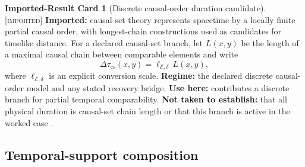 \documentclass[11pt]{article}
\newcommand{\Imp}{\textsc{[imported]}}
\theoremstyle{definition}
\newtheorem{scard}{Imported-Result Card}
\begin{document}
\begin{scard}[Discrete causal-order duration candidate]
\label{card:tspace-causal-set}
\Imp{} \textbf{Imported:} causal-set theory represents spacetime by a locally
finite partial causal order, with longest-chain constructions used as candidates
for timelike distance. For a declared causal-set branch, let $L(x,y)$ be the
length of a maximal causal chain between comparable elements and write
\begin{equation}
\Delta\tau_{\mathrm{cs}}(x,y)=\ell_{\mathcal E,\delta}\,L(x,y),
\label{eq:tspace-causal-set-duration}
\end{equation}
where $\ell_{\mathcal E,\delta}$ is an explicit conversion scale.
\textbf{Regime:} the declared discrete causal-order model and any stated recovery
bridge. \textbf{Use here:} contributes a discrete branch for partial temporal
comparability. \textbf{Not taken to establish:} that all physical duration is
causal-set chain length or that this branch is active in the worked case
\cite{S_BombelliEtAl1987}.
\end{scard}

\subsection{Temporal-support composition}
\label{supp:tspace-composition}
\end{document}
